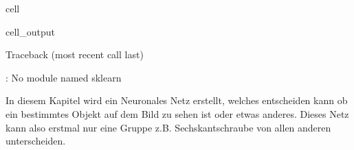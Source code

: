 \documentclass[letterpaper,10pt,english]{jupyterBook}
\begin{document}
\begin{sphinxuseclass}{cell}
\begin{sphinxVerbatimOutput}
\begin{sphinxuseclass}{cell_output}
\begin{sphinxVerbatim}[commandchars=\\\{\}]
Traceback (most recent call last)
\PYGZbs{}\PYGZbs{}\PYGZbs{}  
    
 
    
  
    

: No module named \PYGZsq{}sklearn\PYGZsq{}
\end{sphinxVerbatim}

\end{sphinxuseclass}\end{sphinxVerbatimOutput}

\end{sphinxuseclass}
\sphinxAtStartPar
In diesem Kapitel wird ein Neuronales Netz erstellt, welches entscheiden kann ob ein bestimmtes Objekt auf dem Bild zu sehen ist oder etwas anderes. Dieses Netz kann also erstmal nur eine Gruppe z.B. Sechskantschraube von allen anderen unterscheiden.
\end{document}
